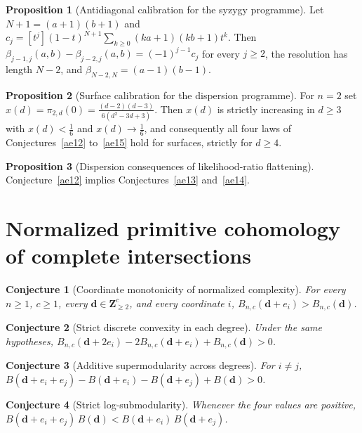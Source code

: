 \documentclass[11pt]{article}
\newtheorem{conjecture}{Conjecture}
\theoremstyle{definition}
\newtheorem{proposition}{Proposition}
\begin{document}
\begin{proposition}[Antidiagonal calibration for the syzygy programme]\label{ae:strand}
Let $N+1=(a+1)(b+1)$ and $c_j=[t^j](1-t)^{N+1}\sum_{k\ge0}(ka+1)(kb+1)t^k$.  Then $\beta_{j-1,j}(a,b)-\beta_{j-2,j}(a,b)=(-1)^{j-1}c_j$ for every $j\ge2$, the resolution has length $N-2$, and $\beta_{N-2,N}=(a-1)(b-1)$.
\end{proposition}

\begin{proposition}[Surface calibration for the dispersion programme]\label{ae:surface}
For $n=2$ set $x(d)=\pi_{2,d}(0)=\frac{(d-2)(d-3)}{6(d^2-3d+3)}$.  Then $x(d)$ is strictly increasing in $d\ge3$ with $x(d)<\tfrac16$ and $x(d)\to\tfrac16$, and consequently all four laws of Conjectures~\ref{ae12} to~\ref{ae15} hold for surfaces, strictly for $d\ge4$.
\end{proposition}

\begin{proposition}[Dispersion consequences of likelihood-ratio flattening]\label{ae:disp}
Conjecture~\ref{ae12} implies Conjectures~\ref{ae13} and~\ref{ae14}.
\end{proposition}

\section{Normalized primitive cohomology of complete intersections}

\begin{conjecture}[Coordinate monotonicity of normalized complexity]\label{ae1}
For every $n\ge1$, $c\ge1$, every $\mathbf d\in\mathbf Z_{\ge2}^c$, and every coordinate $i$, $B_{n,c}(\mathbf d+e_i)>B_{n,c}(\mathbf d)$.
\end{conjecture}

\begin{conjecture}[Strict discrete convexity in each degree]\label{ae2}
Under the same hypotheses, $B_{n,c}(\mathbf d+2e_i)-2B_{n,c}(\mathbf d+e_i)+B_{n,c}(\mathbf d)>0$.
\end{conjecture}

\begin{conjecture}[Additive supermodularity across degrees]\label{ae3}
For $i\ne j$, $B(\mathbf d+e_i+e_j)-B(\mathbf d+e_i)-B(\mathbf d+e_j)+B(\mathbf d)>0$.
\end{conjecture}

\begin{conjecture}[Strict log-submodularity]\label{ae4}
Whenever the four values are positive, $B(\mathbf d+e_i+e_j)\,B(\mathbf d)<B(\mathbf d+e_i)\,B(\mathbf d+e_j)$.
\end{conjecture}
\end{document}

